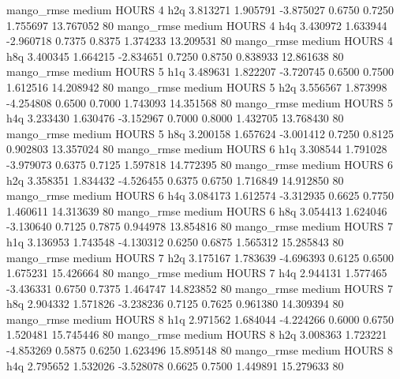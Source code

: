        mango_rmse     medium    HOURS                 4                  h2q  3.813271 1.905791 -3.875027 0.6750 0.7250  1.755697   13.767052 80
       mango_rmse     medium    HOURS                 4                  h4q  3.430972 1.633944 -2.960718 0.7375 0.8375  1.374233   13.209531 80
       mango_rmse     medium    HOURS                 4                  h8q  3.400345 1.664215 -2.834651 0.7250 0.8750  0.838933   12.861638 80
       mango_rmse     medium    HOURS                 5                  h1q  3.489631 1.822207 -3.720745 0.6500 0.7500  1.612516   14.208942 80
       mango_rmse     medium    HOURS                 5                  h2q  3.556567 1.873998 -4.254808 0.6500 0.7000  1.743093   14.351568 80
       mango_rmse     medium    HOURS                 5                  h4q  3.233430 1.630476 -3.152967 0.7000 0.8000  1.432705   13.768430 80
       mango_rmse     medium    HOURS                 5                  h8q  3.200158 1.657624 -3.001412 0.7250 0.8125  0.902803   13.357024 80
       mango_rmse     medium    HOURS                 6                  h1q  3.308544 1.791028 -3.979073 0.6375 0.7125  1.597818   14.772395 80
       mango_rmse     medium    HOURS                 6                  h2q  3.358351 1.834432 -4.526455 0.6375 0.6750  1.716849   14.912850 80
       mango_rmse     medium    HOURS                 6                  h4q  3.084173 1.612574 -3.312935 0.6625 0.7750  1.460611   14.313639 80
       mango_rmse     medium    HOURS                 6                  h8q  3.054413 1.624046 -3.130640 0.7125 0.7875  0.944978   13.854816 80
       mango_rmse     medium    HOURS                 7                  h1q  3.136953 1.743548 -4.130312 0.6250 0.6875  1.565312   15.285843 80
       mango_rmse     medium    HOURS                 7                  h2q  3.175167 1.783639 -4.696393 0.6125 0.6500  1.675231   15.426664 80
       mango_rmse     medium    HOURS                 7                  h4q  2.944131 1.577465 -3.436331 0.6750 0.7375  1.464747   14.823852 80
       mango_rmse     medium    HOURS                 7                  h8q  2.904332 1.571826 -3.238236 0.7125 0.7625  0.961380   14.309394 80
       mango_rmse     medium    HOURS                 8                  h1q  2.971562 1.684044 -4.224266 0.6000 0.6750  1.520481   15.745446 80
       mango_rmse     medium    HOURS                 8                  h2q  3.008363 1.723221 -4.853269 0.5875 0.6250  1.623496   15.895148 80
       mango_rmse     medium    HOURS                 8                  h4q  2.795652 1.532026 -3.528078 0.6625 0.7500  1.449891   15.279633 80
